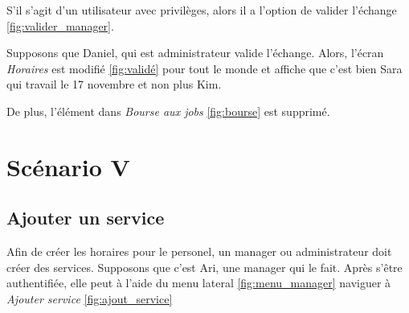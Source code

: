 S'il s'agit d'un utilisateur avec privilèges, alors il a l'option de valider l'échange \ref{fig:valider_manager}. 

Supposons que Daniel, qui est administrateur valide l'échange. Alors, l'écran \textit{Horaires} est modifié \ref{fig:validé}
pour tout le monde et affiche que c'est bien Sara qui travail le 17 novembre et non plus Kim. 

De plus, l'élément dans \textit{Bourse aux jobs} \ref{fig:bourse} est supprimé.
\newpage

\section[Ajouter un service - Scénario V]{Scénario V}
    \subsection*{Ajouter un service}
    Afin de créer les horaires pour le personel, un manager ou administrateur doit créer des services. Supposons
    que c'est Ari, une manager qui le fait. Après s'être authentifiée, elle peut à l'aide du menu lateral \ref{fig:menu_manager} naviguer
    à \textit{Ajouter service} \ref{fig:ajout_service}

